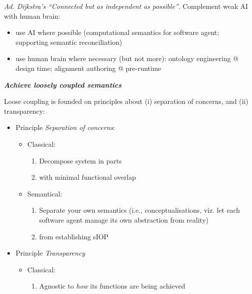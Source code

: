 \documentclass[a4paper,11pt,oneside,oldfontcommands]{memoir}
\newcounter{para}
\theoremstyle{definition}
\theoremstyle{break}		%
\numberwithin{equation}{chapter}
\numberwithin{figure}{chapter}
\begin{document}
\emph{Ad. Dijkstra's ``Connected but as independent as possible''}.
Complement weak AI with human brain:

\begin{itemize}
\tightlist
\item
  use AI where possible (computational semantics for software agent;
  supporting semantic reconciliation)
\item
  use human brain where necessary (but not more): ontology engineering @
  design time; alignment authoring @ pre-runtime
\end{itemize}

\textbf{\emph{Achieve loosely coupled semantics}}

Loose coupling is founded on principles about (i) separation of
concerns, and (ii) transparency:

\begin{itemize}
\tightlist
\item
  Principle \emph{Separation of concerns}:

  \begin{itemize}
  \tightlist
  \item
    Classical:

    \begin{enumerate}
    \def\labelenumi{\roman{enumi}.}
    \tightlist
    \item
      Decompose system in parts
    \item
      with minimal functional overlap
    \end{enumerate}
  \item
    Semantical:

    \begin{enumerate}
    \def\labelenumi{\roman{enumi}.}
    \tightlist
    \item
      Separate your own semantics (i.e., conceptualisations, viz. let
      each software agent manage its own abstraction from reality)
    \item
      from establishing sIOP
    \end{enumerate}
  \end{itemize}
\item
  Principle \emph{Transparency}

  \begin{itemize}
  \tightlist
  \item
    Classical:

    \begin{enumerate}
    \def\labelenumi{\roman{enumi}.}
    \tightlist
    \item
      Agnostic to \emph{how} its functions are being achieved
    \end{enumerate}


\end{itemize}
\end{itemize}
\end{document}
